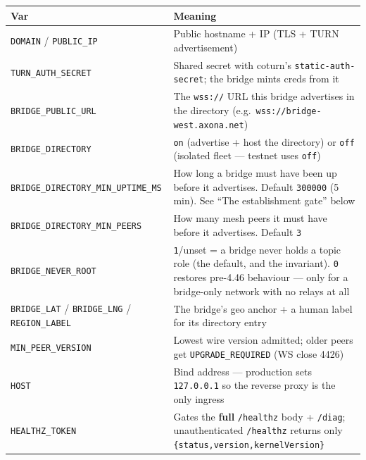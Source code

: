 \documentclass[
  nobib]{tufte-handout}
\newcounter{none} %
\begin{document}
{\def\LTcaptype{none} %
\begin{longtable}[]{@{}
  >{\raggedright\arraybackslash}p{}
  >{\raggedright\arraybackslash}p{}@{}}
\toprule\noalign{}
\begin{minipage}[b]{\linewidth}\raggedright
Var
\end{minipage} & \begin{minipage}[b]{\linewidth}\raggedright
Meaning
\end{minipage} \\
\midrule\noalign{}
\endhead
\bottomrule\noalign{}
\endlastfoot
\texttt{DOMAIN} / \texttt{PUBLIC\_IP} & Public hostname + IP (TLS + TURN
advertisement) \\
\texttt{TURN\_AUTH\_SECRET} & Shared secret with coturn's
\texttt{static-auth-secret}; the bridge mints creds from it \\
\texttt{BRIDGE\_PUBLIC\_URL} & The \texttt{wss://} URL this bridge
advertises in the directory
(e.g.~\texttt{wss://bridge-west.axona.net}) \\
\texttt{BRIDGE\_DIRECTORY} & \texttt{on} (advertise + host the
directory) or \texttt{off} (isolated fleet --- testnet uses
\texttt{off}) \\
\texttt{BRIDGE\_DIRECTORY\_MIN\_UPTIME\_MS} & How long a bridge must
have been up before it advertises. Default \texttt{300000} (5 min). See
``The establishment gate'' below \\
\texttt{BRIDGE\_DIRECTORY\_MIN\_PEERS} & How many mesh peers it must
have before it advertises. Default \texttt{3} \\
\texttt{BRIDGE\_NEVER\_ROOT} & \texttt{1}/unset = a bridge never holds a
topic role (the default, and the invariant). \texttt{0} restores
pre-4.46 behaviour --- only for a bridge-only network with no relays at
all \\
\texttt{BRIDGE\_LAT} / \texttt{BRIDGE\_LNG} / \texttt{REGION\_LABEL} &
The bridge's geo anchor + a human label for its directory entry \\
\texttt{MIN\_PEER\_VERSION} & Lowest wire version admitted; older peers
get \texttt{UPGRADE\_REQUIRED} (WS close 4426) \\
\texttt{HOST} & Bind address --- production sets \texttt{127.0.0.1} so
the reverse proxy is the only ingress \\
\texttt{HEALTHZ\_TOKEN} & Gates the \textbf{full} \texttt{/healthz} body
+ \texttt{/diag}; unauthenticated \texttt{/healthz} returns only
\texttt{\{status,version,kernelVersion\}} \\
\end{longtable}
}
\end{document}
